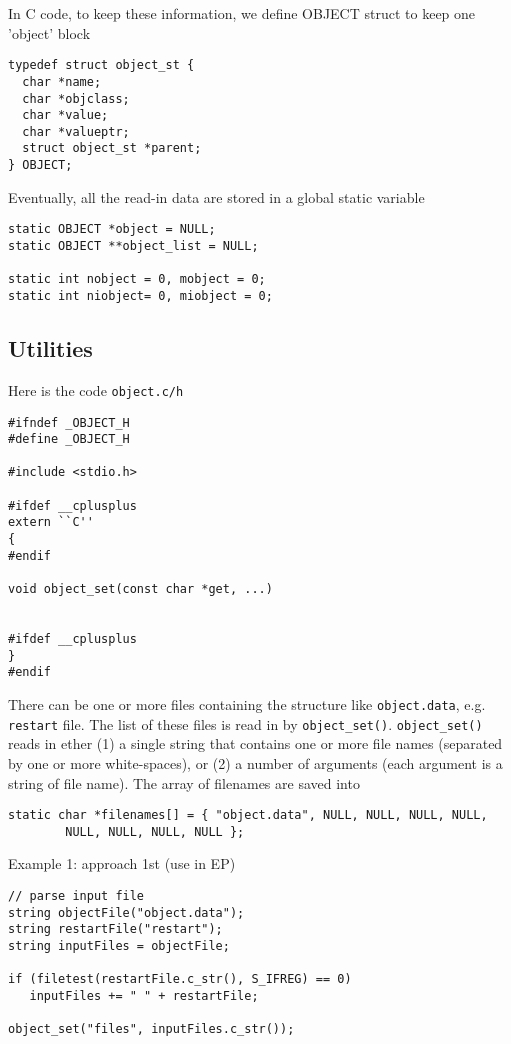 In C code, to keep these information, we define OBJECT struct to keep one
'object' block
\begin{verbatim}
typedef struct object_st {
  char *name;
  char *objclass;
  char *value;
  char *valueptr;
  struct object_st *parent;
} OBJECT;
  \end{verbatim}
  
Eventually, all the read-in data are stored in a global static variable
\begin{verbatim}
static OBJECT *object = NULL;
static OBJECT **object_list = NULL;

static int nobject = 0, mobject = 0;
static int niobject= 0, miobject = 0;
\end{verbatim}

\subsection{Utilities}

Here is the code \verb!object.c/h!
  
{\small \begin{verbatim} 
#ifndef _OBJECT_H
#define _OBJECT_H

#include <stdio.h>

#ifdef __cplusplus
extern ``C''
{
#endif

void object_set(const char *get, ...)


#ifdef __cplusplus
}
#endif
\end{verbatim} }

There can be one or more files containing the structure like \verb!object.data!,
e.g. \verb!restart! file. The list of these files is read in by
\verb!object_set()!. \verb!object_set()! reads in ether (1) a single string that
contains one or more file names (separated by one or more white-spaces), or (2)
a number of arguments (each argument is a string of file name). The array of
filenames are saved into
\begin{verbatim}
static char *filenames[] = { "object.data", NULL, NULL, NULL, NULL, 
        NULL, NULL, NULL, NULL };
\end{verbatim}

Example 1: approach 1st (use in EP) 
\begin{verbatim}
// parse input file
string objectFile("object.data");
string restartFile("restart");
string inputFiles = objectFile;

if (filetest(restartFile.c_str(), S_IFREG) == 0)
   inputFiles += " " + restartFile;

object_set("files", inputFiles.c_str());
\end{verbatim}
 
